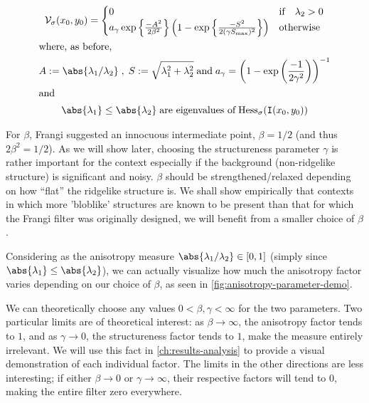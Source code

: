 \begin{gather} \label{eq:Vsigma}
\Vsigma(x_0,y_0) = \begin{cases}
0 & \text{if} \quad \lambda_2 > 0 \\
a_\gamma \exp\left\{\frac{-A^2}{2\beta^2}\right\}
\left(1 - \exp\left\{\frac{-S^2}{2(\gamma S_{\max})^2}\right\}\right) & \text{otherwise}
\end{cases} \\
\shortintertext{where, as before,}
A := \abs{\lambda_1 / \lambda_2}
\;,\;
S := \sqrt{\lambda_1^2 + \lambda_2^2}
\;\textrm{and}\;
a_\gamma = \left(1-\exp\left(\frac{-1}{2\gamma^2}\right)\right)^{-1} \notag\\
\shortintertext{and}
\abs{\lambda_1} \le \abs{\lambda_2}
\; \textrm{are eigenvalues of}\; \Hess_\sigma(\img(x_0, y_0)) \notag
\end{gather}

For $\beta$, Frangi suggested an innocuous intermediate point, $\beta=1/2$ (and thus $2\beta^2 = 1/2$).
As we will show later, choosing the structureness parameter $\gamma$ is rather important for the context especially if the background (non-ridgelike structure) is significant and noisy. $\beta$ should be strengthened/relaxed depending on how ``flat'' the ridgelike structure is. We shall show empirically that contexts in which more 'bloblike' structures are known to be present than that for which the Frangi filter was originally designed, we will benefit from a smaller choice of $\beta$.

Considering as the anisotropy measure $\abs{\lambda_1 / \lambda_2} \in [0,1]$ (simply since $\abs{\lambda_1} \le \abs{\lambda_2}$), we can actually visualize how much the 
anisotropy factor varies depending on our choice of $\beta$, as seen in \cref{fig:anisotropy-parameter-demo}.

We can theoretically choose any values $0 < \beta, \gamma < \infty$ for the two parameters. Two particular limits are of theoretical interest:
as $\beta \to \infty$, the anisotropy factor tends to $1$, and as $\gamma \to 0$, the structureness factor tends to $1$, make the measure entirely irrelevant. We will use this fact in \cref{ch:results-analysis} to provide a visual demonstration of each individual factor. The limits in the other directions are less interesting; if either $\beta \to 0$ or $\gamma \to \infty$, their respective factors will tend to 0, making the entire filter zero everywhere.

